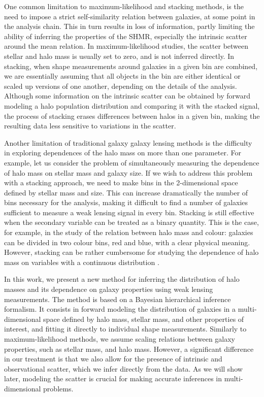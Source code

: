 \documentclass[usenatbib]{mnras}
\begin{document}
One common limitation to maximum-likelihood and stacking methods, is the need to impose a strict self-similarity relation between galaxies, at some point in the analysis chain.
This in turn results in loss of information, partly limiting the ability of inferring the properties of the SHMR, especially the intrinsic scatter around the mean relation.
In maximum-likelihood studies, the scatter between stellar and halo mass is usually set to zero, and is not inferred directly.
In stacking, when shape measurements around galaxies in a given bin are combined, we are essentially assuming that all objects in the bin are either identical or scaled up versions of one another, depending on the details of the analysis.
Although some information on the intrinsic scatter can be obtained by forward modeling a halo population distribution and comparing it with the stacked signal, the process of stacking erases differences between halos in a given bin, making the resulting data less sensitive to variations in the scatter.

Another limitation of traditional galaxy galaxy lensing methods is the difficulty in exploring dependences of the halo mass on more than one parameter.
For example, let us consider the problem of simultaneously measuring the dependence of halo mass on stellar mass and galaxy size.
If we wish to address this problem with a stacking approach, we need to make bins in the 2-dimensional space defined by stellar mass and size.
This can increase dramatically the number of bins necessary for the analysis, making it difficult to find a number of galaxies sufficient to measure a weak lensing signal in every bin.
Stacking is still effective when the secondary variable can be treated as a binary quantity. 
This is the case, for example, in the study of the relation between halo mass and colour: galaxies can be divided in two colour bins, red and blue, with a clear physical meaning.
However, stacking can be rather cumbersome for studying the dependence of halo mass on variables with a continuous distribution \citep[although see][for a successful 2-dimensional stacked weak lensing analysis]{Z+M17}.

In this work, we present a new method for inferring the distribution of halo masses and its dependence on galaxy properties using weak lensing measurements. The method is based on a Bayesian hierarchical inference formalism. It consists in forward modeling the distribution of galaxies in a multi-dimensional space defined by halo mass, stellar mass, and other properties of interest, and fitting it directly to individual shape measurements.
Similarly to maximum-likelihood methods, we assume scaling relations between galaxy properties, such as stellar mass, and halo mass. 
However, a significant difference in our treatment is that we also allow for the presence of intrinsic and observational scatter, which we infer directly from the data. As we will show later, modeling the scatter is crucial for making accurate inferences in multi-dimensional problems.
\end{document}
